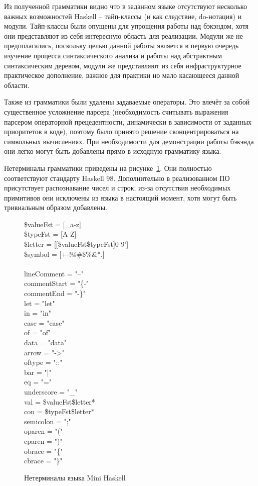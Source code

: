 \documentclass[a4paper,12pt]{article}
\begin{document}
Из полученной грамматики видно что в заданном языке отсутствуют несколько важных
возможностей Haskell -- тайп-классы (и как следствие, do-нотация) и
модули. Тайп-классы были опущены для упрощения работы над бэкэндом, хотя они
представляют из себя интересную область для реализации. Модули же не
предполагались, поскольку целью данной работы является в первую очередь изучение
процесса синтаксического анализа и работы над абстрактным синтаксическим
деревом, модули же представляют из себя инфраструктурное практическое
дополнение, важное для практики но мало касающееся данной области.

Также из грамматики были удалены задаваемые операторы. Это влечёт за собой
существенное усложнение парсера (необходимость считывать выражения парсером
операторной прецедентности, динамически в зависимости от заданных приоритетов в
коде), поэтому было принято решение сконцентрироваться на символьных
вычислениях. При необходимости для демонстрации работы бэкэнда они легко могут
быть добавлены прямо в исходную грамматику языка.

Нетерминалы грамматики приведены на рисунке~\ref{nonterms}. Они полностью
соответствуют стандарту Haskell 98. Дополнительно в реализованном ПО
присутствует распознавание чисел и строк; из-за отсутствия необходимых
примитивов они исключены из языка в настоящий момент, хотя могут быть
тривиальным образом добавлены.

\begin{figure}
    \$valueFst = [\_a-z] \\
    \$typeFst = [A-Z] \\
    \$letter = [[\$valueFst\$typeFst]0-9'] \\
    \$symbol = [+-!@\#\$\%\^\&*.] \\
    \\
    lineComment = "--" \\
    commentStart = "\{-" \\
    commentEnd = "-\}" \\
    let = "let" \\
    in = "in" \\
    case = "case" \\
    of = "of" \\
    data = "data" \\
    arrow = "->" \\
    oftype = "::" \\
    bar = "|" \\
    eq = "=" \\
    underscore = "\_" \\
    val = \$valueFst\$letter* \\
    con = \$typeFst\$letter* \\
    semicolon = ";" \\
    oparen = "(" \\
    cparen = ")" \\
    obrace = "\{" \\
    cbrace = "\}" \\
  \caption{Нетерминалы языка Mini Haskell}
  \label{nonterms}
\end{figure}
\end{document}
